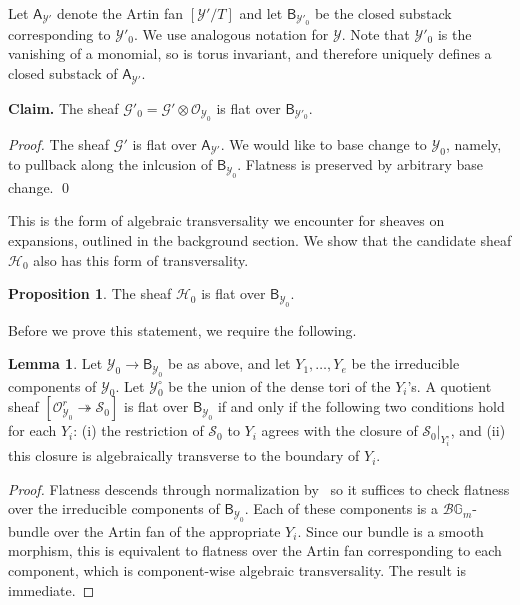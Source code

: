 \documentclass[11pt]{amsart}
\theoremstyle{definition}
\theoremstyle{definition}
\newtheorem{lemma}[theorem]{Lemma}
\newtheorem{proposition}[theorem]{Proposition}
\newcommand{\cG}{\mathcal{G}}
\newcommand{\cY}{\mathcal{Y}}
\newcommand{\cal}{\mathcal}
\def\cY{{\cal Y}}
\begin{document}
Let $\mathsf A_{\cY'}$ denote the Artin fan $[\cY'/T]$ and let $\mathsf B_{\cY'_0}$ be the closed substack corresponding to $\cY'_0$. We use analogous notation for $\cY$. Note that $\cY'_0$ is the vanishing of a monomial, so is torus invariant, and therefore uniquely defines a closed substack of $\mathsf A_{\cY'}$. 

\noindent
{\bf Claim.} The sheaf $\cG'_0 = \cG'\otimes \mathcal O_{\cY_0}$ is flat over $\mathsf B_{\cY'_0}$. 

\noindent
{\it Proof.} The sheaf $\cG'$ is flat over $\mathsf A_{\cY'}$. We would like to base change to $\mathcal Y_0$, namely, to pullback along the inlcusion of $\mathsf B_{\mathcal Y_0}$. Flatness is preserved by arbitrary base change. \qed

This is the form of algebraic transversality we encounter for sheaves on expansions, outlined in the background section. We show that the candidate sheaf $\mathcal H_0$ also has this form of transversality. 

\begin{proposition}\label{prop: candidate-is-flat}
The sheaf $\mathcal H_0$ is flat over $\mathsf B_{\cY_0}$. 
\end{proposition}

Before we prove this statement, we require the following. 

\begin{lemma}\label{lem: flat-over-broken}
Let $\cY_0\to \mathsf B_{\cY_0}$ be as above, and let $Y_1,\ldots, Y_e$ be the irreducible components of $\cY_0$. Let $\cY_0^\circ$ be the union of the dense tori of the $Y_i$'s. A quotient sheaf $[\mathcal O_{\cY_0}^r\twoheadrightarrow \mathcal S_0]$ is flat over $\mathsf B_{\cY_0}$ if and only if the following two conditions hold for each $Y_i$: (i) the restriction of $\mathcal S_0$ to $Y_i$ agrees with the closure of $\mathcal S_0|_{Y_i^\circ}$, and (ii) this closure is algebraically transverse to the boundary of $Y_i$. 
\end{lemma}

\begin{proof}
Flatness descends through normalization by~\cite[\href{https://stacks.math.columbia.edu/tag/0533}{Tag 0533}]{stacks-project} so it suffices to check flatness over the irreducible components of $\mathsf B_{\cY_0}$. Each of these components is a $\mathcal B\mathbb G_m$-bundle over the Artin fan of the appropriate $Y_i$. Since our bundle is a smooth morphism, this is equivalent to flatness over the Artin fan corresponding to each component, which is component-wise algebraic transversality. The result is immediate. 
\end{proof}
\end{document}
